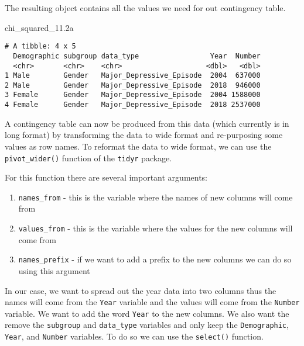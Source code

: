 \documentclass[
]{article}
\newenvironment{Shaded}{\begin{snugshade}}{\end{snugshade}}
\newcommand{\FloatTok}[1]{\textcolor[rgb]{0.00,0.00,0.81}{#1}}
\newcommand{\NormalTok}[1]{#1}
\providecommand{\tightlist}{%
  \setlength{\itemsep}{0pt}\setlength{\parskip}{0pt}}
\begin{document}
The resulting object contains all the values we need for out contingency
table.

\begin{Shaded}
\begin{Highlighting}[]
\NormalTok{chi_squared_}\FloatTok{11.2}\NormalTok{a}
\end{Highlighting}
\end{Shaded}

\begin{verbatim}
# A tibble: 4 x 5
  Demographic subgroup data_type                 Year  Number
  <chr>       <chr>    <chr>                    <dbl>   <dbl>
1 Male        Gender   Major_Depressive_Episode  2004  637000
2 Male        Gender   Major_Depressive_Episode  2018  946000
3 Female      Gender   Major_Depressive_Episode  2004 1588000
4 Female      Gender   Major_Depressive_Episode  2018 2537000
\end{verbatim}

A contingency table can now be produced from this data (which currently
is in long format) by transforming the data to wide format and
re-purposing some values as row names. To reformat the data to wide
format, we can use the \texttt{pivot\_wider()} function of the
\texttt{tidyr} package.

For this function there are several important arguments:

\begin{enumerate}
\def\labelenumi{\arabic{enumi}.}
\tightlist
\item
  \texttt{names\_from} - this is the variable where the names of new
  columns will come from
\item
  \texttt{values\_from} - this is the variable where the values for the
  new columns will come from
\item
  \texttt{names\_prefix} - if we want to add a prefix to the new columns
  we can do so using this argument
\end{enumerate}

In our case, we want to spread out the year data into two columns thus
the names will come from the \texttt{Year} variable and the values will
come from the \texttt{Number} variable. We want to add the word
\texttt{Year} to the new columns. We also want the remove the
\texttt{subgroup} and \texttt{data\_type} variables and only keep the
\texttt{Demographic}, \texttt{Year}, and \texttt{Number} variables. To
do so we can use the \texttt{select()} function.

\hypertarget{section-42}{%
\paragraph{}\label{section-42}}
\end{document}
